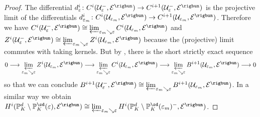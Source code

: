 \documentclass[a4paper, reqno, 10pt]{amsart}
\theoremstyle{definition}
\numberwithin{equation}{section}
\newcommand{\lra}{\longrightarrow}
\newcommand{\ra}{\rightarrow}
\newcommand{\BP}{{\mathbb {P}}}
\newcommand{\CE}{{\mathcal {E}}}
\newcommand{\CU}{{\mathcal {U}}}
\begin{document}
\begin{proof}
	
	The differential $d^i_\varepsilon \colon C^i (\CU_\varepsilon^-,\CE^\rigbun) \ra C^{i+1} (\CU_{\varepsilon}^-,\CE^\rigbun)$ is the projective limit of the differentials $d^i_{\varepsilon_m} \colon C^i(\CU_{\varepsilon_m},\CE^\rigbun) \ra C^{i+1}(\CU_{\varepsilon_m},\CE^\rigbun) $.
	Therefore we have $C^i(\CU_{\varepsilon}^-,\CE^\rigbun) \cong \varprojlim_{\varepsilon_m \searrow \varepsilon} C^i(\CU_{\varepsilon_{m}},\CE^\rigbun)$ and $Z^i(\CU_{\varepsilon}^-,\CE^\rigbun) \cong \varprojlim_{\varepsilon_m \searrow \varepsilon} Z^i(\CU_{\varepsilon_{m}},\CE^\rigbun)$ because the (projective) limit commutes with taking kernels.
	But by , there is the short strictly exact sequence
	\begin{equation*}
		0 \lra \varprojlim_{\varepsilon_m \searrow \varepsilon} Z^i(\CU_{\varepsilon_{m}}, \CE^\rigbun) \lra \varprojlim_{\varepsilon_m \searrow \varepsilon} C^i(\CU_{\varepsilon_m}, \CE^\rigbun) \lra \varprojlim_{\varepsilon_m \searrow \varepsilon} B^{i+1}( \CU_{\varepsilon_m},\CE^\rigbun) \lra 0 
	\end{equation*}
	so that we can conclude $B^{i+1} (\CU_{\varepsilon}^- , \CE^\rigbun) \cong \varprojlim_{\varepsilon_m \searrow \varepsilon} B^{i+1} (\CU_{\varepsilon_m} , \CE^\rigbun) $. 
	In a similar way we obtain $H^{i}( \BP_K^d \setminus \BP_K^\sd (\varepsilon) , \CE^\rigbun) \cong \varprojlim_{\varepsilon_m \searrow \varepsilon} H^{i}( \BP_K^d \setminus \BP_K^\sd (\varepsilon_m)^- , \CE^\rigbun)$.
	

\end{proof}
\end{document}
